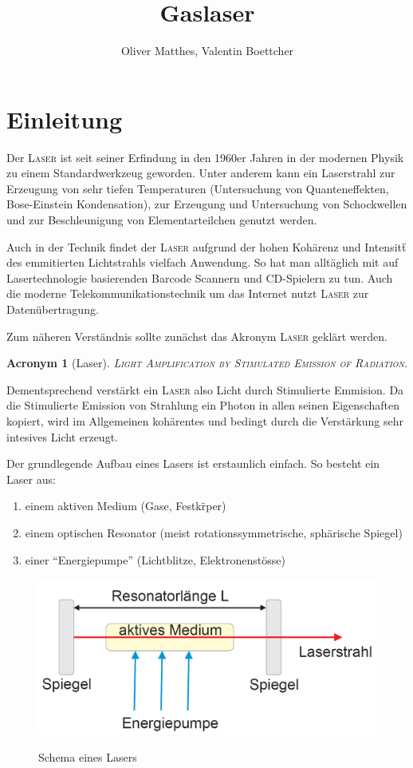 \documentclass[slug=GL, room=HZDR\ Dresden/Rossendorf\,\ Geb.\ 620/123, supervisor=Martin\ Rehwald;\, Tim\ Ziegler]{../../Lab_Report_LaTeX/lab_report}
\title{Gaslaser}
\author{Oliver Matthes, Valentin Boettcher}
\newcommand{\laser}{\textsc{Laser}}
\newtheorem{acro}{Acronym}[section]
\begin{document}
\maketitle

\section{Einleitung}%
\label{sec:intro}
Der \laser{} ist seit seiner Erfindung in den 1960er Jahren in der
modernen Physik zu einem Standardwerkzeug geworden. Unter anderem
kann ein Laserstrahl zur Erzeugung von sehr tiefen Temperaturen
(Untersuchung von Quanteneffekten, Bose-Einstein Kondensation), zur
Erzeugung und Untersuchung von Schockwellen und zur Beschleunigung von
Elementarteilchen genutzt werden.

 Auch in der Technik findet der \laser{} aufgrund
der hohen Koh\"arenz und Intensit\"t des emmitierten Lichtstrahls
vielfach Anwendung. So hat man allt\"aglich mit auf Lasertechnologie
basierenden Barcode Scannern und CD-Spielern zu tun. Auch die moderne
Telekommunikationstechnik um das Internet nutzt \laser{} zur
Daten\"ubertragung.

Zum n\"aheren Verst\"andnis sollte zun\"achst das Akronym \laser{}
gekl\"art werden.

\begin{acro}[Laser]
\textsc{Light Amplification by Stimulated Emission of Radiation.}
\end{acro}

Dementsprechend verst\"arkt ein \laser{} also Licht durch Stimulierte
Emmision. Da die Stimulierte Emission von Strahlung ein Photon in
allen seinen Eigenschaften kopiert, wird im Allgemeinen koh\"arentes
und bedingt durch die Verst\"arkung sehr intesives Licht erzeugt.

Der grundlegende Aufbau eines Lasers ist erstaunlich einfach. So
besteht ein Laser aus:

\begin{enumerate}
\item einem aktiven Medium (Gase, Festk\"rper)
\item einem optischen Resonator (meist rotationssymmetrische, sph\"arische Spiegel)
\item einer ``Energiepumpe'' (Lichtblitze, Elektronenst\"osse)
\end{enumerate}

\begin{figure}[H]\centering\label{fig:aufb}
  \includegraphics[width=.5\columnwidth]{schema.png}
  \caption[Aufbau]{Schema eines Lasers}
\end{figure}
\end{document}
